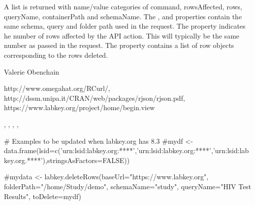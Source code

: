 \documentclass{article}
\begin{document}
\begin{Value}
A list is returned with name/value categories of command, rowsAffected, rows, queryName, containerPath and schemaName.
The ,  and  properties contain the same schema, query 
and folder path used in the request.  The
 property indicates he number of rows affected by the API action. This will typically be the same
number as passed in the request. The  property contains a list of row objects corresponding to the rows
deleted.
\end{Value}
\begin{Author}\relax
Valerie Obenchain
\end{Author}
\begin{References}\relax
http://www.omegahat.org/RCurl/, \\
http://dssm.unipa.it/CRAN/web/packages/rjson/rjson.pdf,\\
https://www.labkey.org/project/home/begin.view
\end{References}
\begin{SeeAlso}\relax
{}, , , 
, 
\end{SeeAlso}
\begin{Examples}
\begin{ExampleCode}
# Examples to be updated when labkey.org has 8.3
#mydf <- data.frame(lsid=c('urn:lsid:labkey.org:****','urn:lsid:labkey.org:****','urn:lsid:labkey.org.****'),stringsAsFactors=FALSE))

#mydata <- labkey.deleteRows(baseUrl="https://www.labkey.org", folderPath="/home/Study/demo", schemaName="study", queryName="HIV Test Results", toDelete=mydf)

\end{ExampleCode}
\end{Examples}
\end{document}
